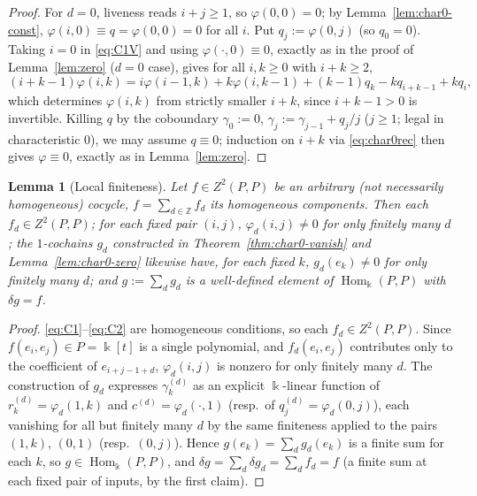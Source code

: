 \documentclass[11pt,reqno]{amsart}
\theoremstyle{plain}
\newtheorem{lemma}[theorem]{Lemma}
\theoremstyle{definition}
\DeclareMathOperator{\Hom}{Hom}
\newcommand{\kk}{\Bbbk}
\newcommand{\Zt}{Z^2}
\begin{document}
\begin{proof}
For $d=0$, liveness reads $i+j\ge1$, so $\varphi(0,0)=0$; by Lemma~\ref{lem:char0-const},
$\varphi(i,0)\equiv q=\varphi(0,0)=0$ for all $i$. Put $q_j:=\varphi(0,j)$ (so $q_0=0$).
Taking $i=0$ in \eqref{eq:C1V} and using $\varphi(\cdot,0)\equiv0$, exactly as in the proof of
Lemma~\ref{lem:zero} ($d=0$ case), gives for all $i,k\ge0$ with $i+k\ge2$,
\begin{equation}
(i+k-1)\varphi(i,k)=i\varphi(i-1,k)+k\varphi(i,k-1)+(k-1)q_k-kq_{i+k-1}+kq_i,
\label{eq:char0rec}
\end{equation}
which determines $\varphi(i,k)$ from strictly smaller $i+k$, since $i+k-1>0$ is invertible.
Killing $q$ by the coboundary $\gamma_0:=0$, $\gamma_j:=\gamma_{j-1}+q_j/j$ ($j\ge1$; legal in
characteristic $0$), we may assume $q\equiv0$; induction on $i+k$ via \eqref{eq:char0rec}
then gives $\varphi\equiv0$, exactly as in Lemma~\ref{lem:zero}.
\end{proof}

\begin{lemma}[Local finiteness]\label{lem:local-finite}
Let $f\in\Zt(P,P)$ be an arbitrary \textup{(}not necessarily homogeneous\textup{)} cocycle,
$f=\sum_{d\in\mathbb{Z}}f_d$ its homogeneous components. Then each $f_d\in\Zt(P,P)$; for each
fixed pair $(i,j)$, $\varphi_d(i,j)\ne0$ for only finitely many $d$; the $1$-cochains $g_d$
constructed in Theorem~\ref{thm:char0-vanish} and Lemma~\ref{lem:char0-zero} likewise have,
for each fixed $k$, $g_d(e_k)\ne0$ for only finitely many $d$; and $g:=\sum_d g_d$ is a
well-defined element of $\Hom_\kk(P,P)$ with $\delta g=f$.
\end{lemma}

\begin{proof}
\eqref{eq:C1}--\eqref{eq:C2} are homogeneous conditions, so each $f_d\in\Zt(P,P)$. Since
$f(e_i,e_j)\in P=\kk[t]$ is a single polynomial, and $f_d(e_i,e_j)$ contributes only to the
coefficient of $e_{i+j-1+d}$, $\varphi_d(i,j)$ is nonzero for only finitely many $d$. The
construction of $g_d$ expresses $\gamma^{(d)}_k$ as an explicit $\kk$-linear function of
$r_k^{(d)}=\varphi_d(1,k)$ and $c^{(d)}=\varphi_d(\cdot,1)$ (resp.\ of
$q_j^{(d)}=\varphi_d(0,j)$), each vanishing for all but finitely many $d$ by the same
finiteness applied to the pairs $(1,k)$, $(0,1)$ (resp.\ $(0,j)$). Hence $g(e_k)=\sum_d
g_d(e_k)$ is a finite sum for each $k$, so $g\in\Hom_\kk(P,P)$, and $\delta g=\sum_d\delta
g_d=\sum_d f_d=f$ (a finite sum at each fixed pair of inputs, by the first claim).
\end{proof}
\end{document}
